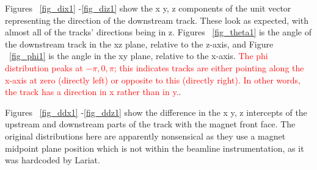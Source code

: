  Figures ~\ref{fig_dix1} -\ref{fig_diz1} show the x y, z components of the unit vector representing the direction of the downstream track. These look as expected, with almost all of the tracks' directions being in z. Figures ~\ref{fig_theta1} is the angle of the downstream track in the xz plane, relative to the z-axis, and Figure ~\ref{fig_phi1} is the angle in the xy plane, relative to the x-axis. \textcolor{red}{The phi distribution peaks at $-\pi, 0, \pi$; this indicates tracks are either pointing along the x-axis at zero (directly left) or opposite to this (directly right). In other words, the track has a direction in x rather than in y.}.
 
  Figures ~\ref{fig_ddx1} -\ref{fig_ddz1} show the difference in the x y, z intercepts of the upstream and downstream parts of the track with the magnet front face. The original distributions here are apparently nonsensical as they use a magnet midpoint plane position which is not within the beamline instrumentation, as it was hardcoded by Lariat.  
 
